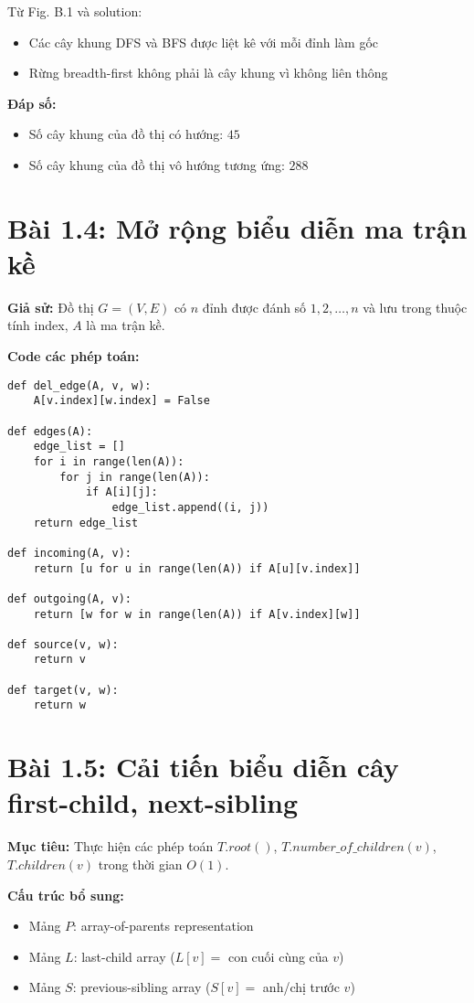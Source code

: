\documentclass[12pt]{article}
\begin{document}
Từ Fig. B.1 và solution:
\begin{itemize}
    \item Các cây khung DFS và BFS được liệt kê với mỗi đỉnh làm gốc
    \item Rừng breadth-first không phải là cây khung vì không liên thông
\end{itemize}

\textbf{Đáp số:} 
\begin{itemize}
    \item Số cây khung của đồ thị có hướng: $\boxed{45}$
    \item Số cây khung của đồ thị vô hướng tương ứng: $\boxed{288}$
\end{itemize}

\section{Bài 1.4: Mở rộng biểu diễn ma trận kề}

\textbf{Giả sử:} Đồ thị $G = (V,E)$ có $n$ đỉnh được đánh số $1,2,\ldots,n$ và lưu trong thuộc tính index, $A$ là ma trận kề.

\textbf{Code các phép toán:}

\begin{lstlisting}
def del_edge(A, v, w):
    A[v.index][w.index] = False

def edges(A):
    edge_list = []
    for i in range(len(A)):
        for j in range(len(A)):
            if A[i][j]:
                edge_list.append((i, j))
    return edge_list

def incoming(A, v):
    return [u for u in range(len(A)) if A[u][v.index]]

def outgoing(A, v):
    return [w for w in range(len(A)) if A[v.index][w]]

def source(v, w):
    return v

def target(v, w):
    return w
\end{lstlisting}

\section{Bài 1.5: Cải tiến biểu diễn cây first-child, next-sibling}

\textbf{Mục tiêu:} Thực hiện các phép toán $T.root()$, $T.number\_of\_children(v)$, $T.children(v)$ trong thời gian $O(1)$.

\textbf{Cấu trúc bổ sung:}
\begin{itemize}
    \item Mảng $P$: array-of-parents representation  
    \item Mảng $L$: last-child array ($L[v] =$ con cuối cùng của $v$)
    \item Mảng $S$: previous-sibling array ($S[v] =$ anh/chị trước $v$)
\end{itemize}
\end{document}
